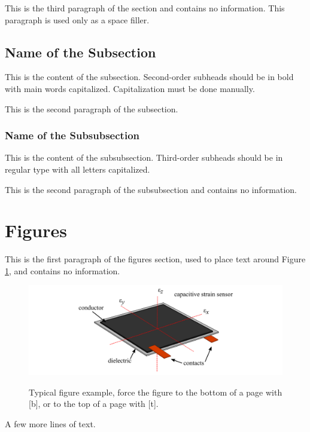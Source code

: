 \documentclass[12pt,letterpaper,onecolumn]{article}
\begin{document}
This is the third paragraph of the section and contains no information. This paragraph is used only as a space filler. \lipsum[1]
\subsection{Name of the Subsection}

This is the content of the subsection. Second-order subheads should be in bold with main words capitalized. Capitalization must be done manually. 

This is the second paragraph of the subsection. 

\subsubsection{Name of the Subsubsection}

This is the content of the subsubsection. Third-order subheads should be in regular type with all letters capitalized. 

This is the second paragraph of the subsubsection and contains no information. \lipsum[1]

\section{Figures}

This is the first paragraph of the figures section, used to place text around Figure \ref{fig:example}, and contains no information. \lipsum[3]

\begin{figure}[t]%
\centering
\includegraphics[width=1.0\linewidth]{figures/template_figure.png} \\
\vspace{1\baselineskip} 
\caption{Typical figure example, force the figure to the bottom of a page with [b], or to the top of a page with [t].}
\label{fig:example}
\vspace{2\baselineskip} %
\end{figure}

A few more lines of text. \lipsum[5]

\FloatBarrier



{\footnotesize} %
\end{document}

